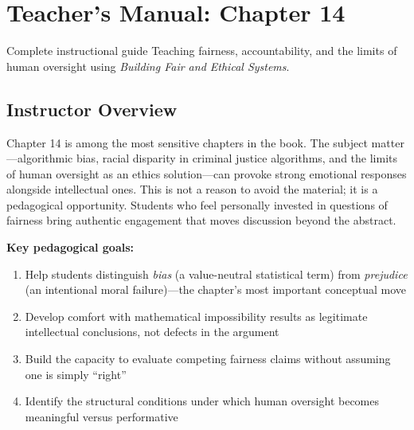 
\chapter{Teacher's Manual: Chapter 14}
\label{ch:teacher-ch14}

\begin{chapterquote}{Complete instructional guide}
Teaching fairness, accountability, and the limits of human oversight using \emph{Building Fair and Ethical Systems}.
\end{chapterquote}

\section*{Instructor Overview}

Chapter 14 is among the most sensitive chapters in the book. The subject matter---algorithmic bias, racial disparity in criminal justice algorithms, and the limits of human oversight as an ethics solution---can provoke strong emotional responses alongside intellectual ones. This is not a reason to avoid the material; it is a pedagogical opportunity. Students who feel personally invested in questions of fairness bring authentic engagement that moves discussion beyond the abstract.

\textbf{Key pedagogical goals:}
\begin{enumerate}
    \item Help students distinguish \emph{bias} (a value-neutral statistical term) from \emph{prejudice} (an intentional moral failure)---the chapter's most important conceptual move
    \item Develop comfort with mathematical impossibility results as legitimate intellectual conclusions, not defects in the argument
    \item Build the capacity to evaluate competing fairness claims without assuming one is simply ``right''
    \item Identify the structural conditions under which human oversight becomes meaningful versus performative
\end{enumerate}

